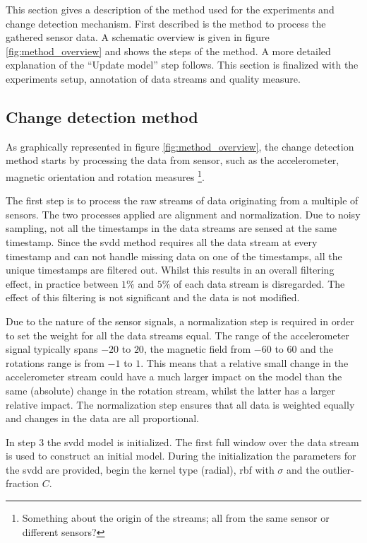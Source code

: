 This section gives a description of the method used for the experiments and change detection mechanism.
First described is the method to process the gathered sensor data.
A schematic overview is given in figure \ref{fig:method_overview} and shows the steps of the method.
A more detailed explanation of the ``Update model'' step follows.
This section is finalized with the experiments setup, annotation of data streams and quality measure.

\subsection{Change detection method}
As graphically represented in figure \ref{fig:method_overview}, the change detection method starts by processing the data from sensor, such as the accelerometer, magnetic orientation and rotation measures \footnote{Something about the origin of the streams; all from the same sensor or different sensors?}.

The first step is to process the raw streams of data originating from a multiple of sensors.
The two processes applied are alignment and normalization.
Due to noisy sampling, not all the timestamps in the data streams are sensed at the same timestamp.
Since the \gls{svdd} method requires all the data stream at every timestamp and can not handle missing data on one of the timestamps, all the unique timestamps are filtered out.
Whilst this results in an overall filtering effect, in practice between $1\%$ and $5\%$ of each data stream is disregarded.
The effect of this filtering is not significant and the data is not modified.

Due to the nature of the sensor signals, a normalization step is required in order to set the weight for all the data streams equal.
The range of the accelerometer signal typically spans $-20$ to $20$, the magnetic field from $-60$ to $60$ and the rotations range is from $-1$ to $1$.
This means that a relative small change in the accelerometer stream could have a much larger impact on the model than the same (absolute) change in the rotation stream, whilst the latter has a larger relative impact.
The normalization step ensures that all data is weighted equally and changes in the data are all proportional.

In step $3$ the \gls{svdd} model is initialized.
The first full window over the data stream is used to construct an initial model.
During the initialization the parameters for the \gls{svdd} are provided, begin the kernel type (radial), \gls{rbf} with $\sigma$ and the outlier-fraction $C$.

